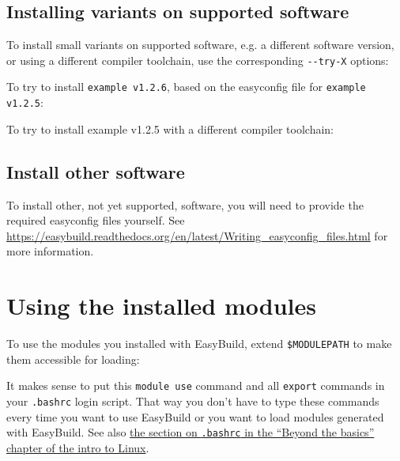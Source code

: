 \subsection{Installing variants on supported software}

To install small variants on supported software, e.g. a different software version,
or using a different compiler toolchain, use the corresponding \lstinline|--try-X| options:

To try to install \lstinline|example v1.2.6|, based on the easyconfig file for \lstinline|example v1.2.5|:

\begin{prompt}
\end{prompt}

To try to install example v1.2.5 with a different compiler toolchain:

\begin{prompt}
\end{prompt}

\subsection{Install other software}

To install other, not yet supported, software, you will need to provide the required
easyconfig files yourself. See \url{https://easybuild.readthedocs.org/en/latest/Writing_easyconfig_files.html}
for more information.

\section{Using the installed modules}

To use the modules you installed with EasyBuild, extend \lstinline|$MODULEPATH|
to make them accessible for loading:

\begin{prompt}
\end{prompt}

It makes sense to put this \lstinline|module use| command and all \lstinline|export|
commands in your \lstinline|.bashrc| login script. That way you don't have to type
these commands every time you want to use EasyBuild or you want to load modules generated
with EasyBuild. See also
\href{\LinuxManualURL#sec:bashrc-login-script}{the section on \texttt{.bashrc} in the ``Beyond the basics'' chapter of the intro to Linux}.

